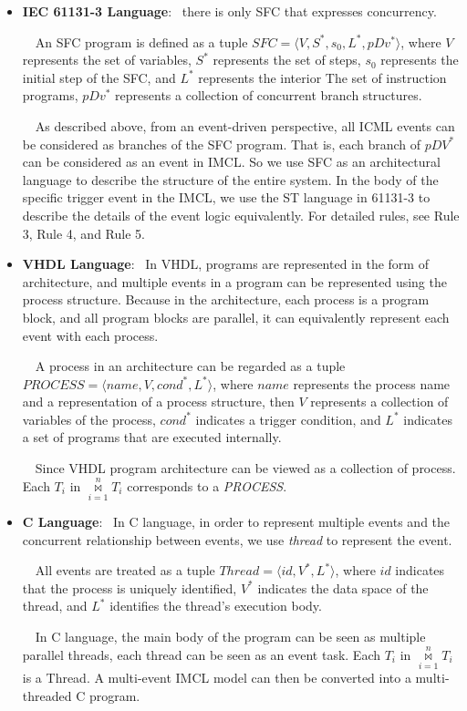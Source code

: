 \begin{itemize}
  \item \textbf{IEC 61131-3 Language}: \ there is only SFC that expresses concurrency.

      \ \ An SFC program is defined as a tuple $SFC = \langle V, S^{*}, s_{0}, L^{*}, pDv^{*} \rangle$, where $V$ represents the set of variables, $S^{*}$ represents the set of steps, $s_0$ represents the initial step of the SFC, and $L^{*}$ represents the interior The set of instruction programs, $pDv^{*}$ represents a collection of concurrent branch structures.

      \ \ As described above, from an event-driven perspective, all ICML events can be considered as branches of the SFC program. That is, each branch of $pDV^*$ can be considered as an event in IMCL. So we use SFC as an architectural language to describe the structure of the entire system. In the body of the specific trigger event in the IMCL, we use the ST language in 61131-3 to describe the details of the event logic equivalently. For detailed rules, see Rule 3, Rule 4, and Rule 5.
  \item \textbf{VHDL Language}: \ In VHDL, programs are represented in the form of architecture, and multiple events in a program can be represented using the process structure. Because in the architecture, each process is a program block, and all program blocks are parallel, it can equivalently represent each event with each process.

      \ \ A process in an architecture can be regarded as a tuple $PROCESS = \langle name, V, cond^{*}, L^{*} \rangle$, where $name$ represents the process name and a representation of a process structure, then $V$ represents a collection of variables of the process, $cond^{*}$ indicates a trigger condition, and $L^{*}$ indicates a set of programs that are executed internally.

      \ \ Since VHDL program architecture can be viewed as a collection of process. Each $T_i$ in $\overset{n}{\underset{i=1}{\bowtie}} T_{i}$ corresponds to a \emph{PROCESS}.
  \item \textbf{C Language}: \ In C language, in order to represent multiple events and the concurrent relationship between events, we use \emph{thread} to represent the event.

      \ \ All events are treated as a tuple $Thread = \langle id, V^*, L^* \rangle$, where $id$ indicates that the process is uniquely identified, $V^*$ indicates the data space of the thread, and $L^*$ identifies the thread's execution body.

      \ \ In C language, the main body of the program can be seen as multiple parallel threads, each thread can be seen as an event task. Each $T_i$ in $\overset{n}{\underset{i=1}{\bowtie}} T_{i}$ is a Thread. A multi-event IMCL model can then be converted into a multi-threaded C program.
\end{itemize}

